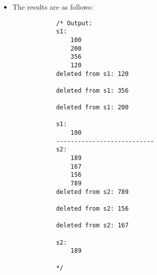 \begin{itemize}
\begin{verbatim}
                // pop operation 
                printf("deleted from s2: %d\n\n",pop(&s2));
                printf("deleted from s2: %d\n\n",pop(&s2));
                printf("deleted from s2: %d\n\n",pop(&s2));
                
                print_s(&s2,"s2"); // print used elements in s1.item
                return 0;
            }
        \end{verbatim}
    
    \item The results are as follows:
        \begin{verbatim}
            /* Output: 
            s1:
                100
                200
                356
                120
            deleted from s1: 120

            deleted from s1: 356

            deleted from s1: 200

            s1:
                100
            ---------------------------
            s2:
                189
                167
                156
                789
            deleted from s2: 789

            deleted from s2: 156

            deleted from s2: 167

            s2:
                189

            */
        \end{verbatim}
\end{itemize}


